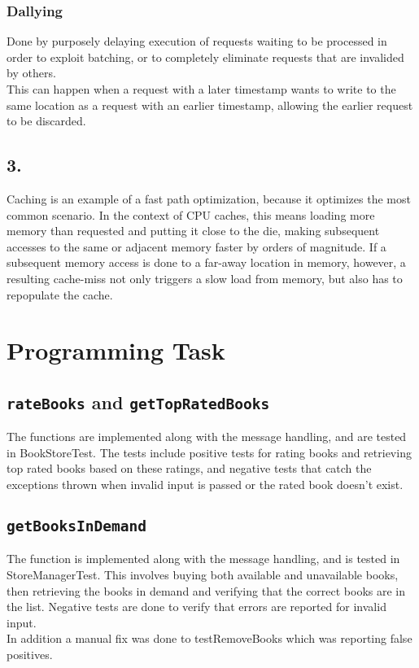 \documentclass[12pt]{article}
\begin{document}
\subsubsection*{Dallying}
Done by purposely delaying execution of requests waiting to be processed in order to exploit batching, or to completely eliminate requests that are invalided by others. \\
This can happen when a request with a later timestamp wants to write to the same location as a request with an earlier timestamp, allowing the earlier request to be discarded.

\subsection*{3.} %

Caching is an example of a fast path optimization, because it optimizes the most common scenario. In the context of CPU caches, this means loading more memory than requested and putting it close to the die, making subsequent accesses to the same or adjacent memory faster by orders of magnitude. If a subsequent memory access is done to a far-away location in memory, however, a resulting cache-miss not only triggers a slow load from memory, but also has to repopulate the cache.

\section*{Programming Task}

\subsection*{\texttt{rateBooks} and \texttt{getTopRatedBooks}}

The functions are implemented along with the message handling, and are tested in BookStoreTest. The tests include positive tests for rating books and retrieving top rated books based on these ratings, and negative tests that catch the exceptions thrown when invalid input is passed or the rated book doesn't exist.

\subsection*{\texttt{getBooksInDemand}}

The function is implemented along with the message handling, and is tested in StoreManagerTest. This involves buying both available and unavailable books, then retrieving the books in demand and verifying that the correct books are in the list. Negative tests are done to verify that errors are reported for invalid input. \\
In addition a manual fix was done to testRemoveBooks which was reporting false positives.
\end{document}
